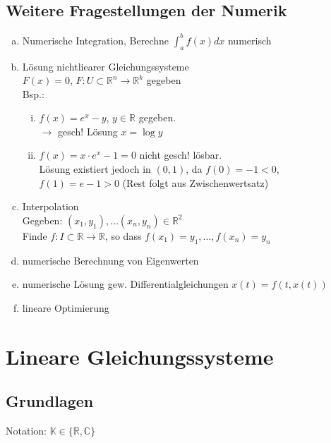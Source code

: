 \subsection{Weitere Fragestellungen der Numerik}

\begin{enumerate}[(a)]
\item
Numerische Integration, Berechne $\int_a^b f(x) dx$ numerisch
\item
Lösung nichtliearer Gleichungssysteme \\
$F(x) = 0$, $F: U \subset \mathbb{R}^n \rightarrow \mathbb{R}^k$ gegeben \\
Bsp.:
\begin{enumerate}[(i)]
\item
$f(x)=e^x-y$, $y \in \mathbb{R}$ gegeben. \\
$\rightarrow$ gesch! Lösung $x = \log y$
\item
$f(x)=x \cdot e^x -1 = 0$ nicht gesch! lösbar. \\
Lösung existiert jedoch in $(0,1)$, da $f(0) = -1 < 0$, \\
$f(1)= e-1>0 $ (Rest folgt aus Zwischenwertsatz)
\end{enumerate}
\item
Interpolation \\
Gegeben: $(x_1,y_1), \dots (x_n,y_n) \in \mathbb{R}^2$\\
Finde $f: I \subset \mathbb{R} \rightarrow \mathbb{R}$, so dass
$f(x_1) = y_1, \dots , f(x_n)=y_n$
\item
numerische Berechnung von Eigenwerten
\item
numerische Lösung gew. Differentialgleichungen $x(t)=f(t,x(t))$
\item
lineare Optimierung
\end{enumerate}

\section{Lineare Gleichungssysteme}
\subsection{Grundlagen}
Notation: $\mathbb{K} \in \{\mathbb{R}, \mathbb{C}\}$ \\

